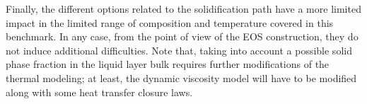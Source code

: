 Finally, the different options related to the solidification path have a more limited impact in the limited range of composition and temperature covered in this benchmark. In any case, from the point of view of the EOS construction, they do not induce additional difficulties. Note that, taking into account a possible solid phase fraction in the liquid layer bulk requires further modifications of the thermal modeling; at least, the dynamic viscosity model will have to be modified along with some heat transfer closure laws.
